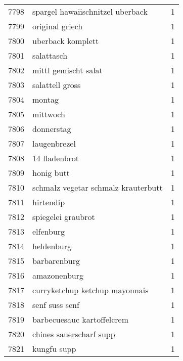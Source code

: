 \begin{tabular}{llr}
7798 &                   spargel hawaiischnitzel uberback &      1 \\
7799 &                                    original griech &      1 \\
7800 &                                  uberback komplett &      1 \\
7801 &                                         salattasch &      1 \\
7802 &                               mittl gemischt salat &      1 \\
7803 &                                    salattell gross &      1 \\
7804 &                                             montag &      1 \\
7805 &                                           mittwoch &      1 \\
7806 &                                         donnerstag &      1 \\
7807 &                                       laugenbrezel &      1 \\
7808 &                                      14 fladenbrot &      1 \\
7809 &                                         honig butt &      1 \\
7810 &                schmalz vegetar schmalz krauterbutt &      1 \\
7811 &                                          hirtendip &      1 \\
7812 &                                 spiegelei graubrot &      1 \\
7813 &                                          elfenburg &      1 \\
7814 &                                         heldenburg &      1 \\
7815 &                                       barbarenburg &      1 \\
7816 &                                       amazonenburg &      1 \\
7817 &                     curryketchup ketchup mayonnais &      1 \\
7818 &                                     senf suss senf &      1 \\
7819 &                         barbecuesauc kartoffelcrem &      1 \\
7820 &                            chines sauerscharf supp &      1 \\
7821 &                                        kungfu supp &      1 \\

\end{tabular}
